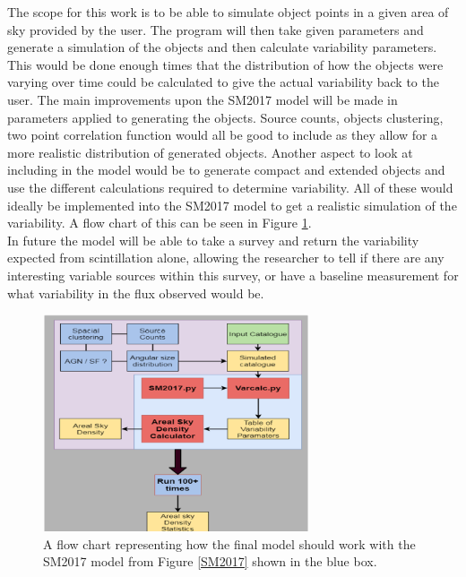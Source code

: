 \documentclass[10pt,a4paper]{article}
\begin{document}
The scope for this work is to be able to simulate object points in a given area of sky provided by the user. The program will then take given parameters and generate a simulation of the objects and then calculate variability parameters. This would be done enough times that the distribution of how the objects were varying over time could be calculated to give the actual variability back to the user. The main improvements upon the SM2017 model will be made in parameters applied to generating the objects. Source counts, objects clustering, two point correlation function would all be good to include as they allow for a more realistic distribution of generated objects. Another aspect to look at including in the model would be to generate compact and extended objects and use the different calculations required to determine variability. All of these would ideally be implemented into the SM2017 model to get a realistic simulation of the variability. A flow chart of this can be seen in Figure \ref{VarSim}.\\

In future the model will be able to take a survey and return the variability expected from scintillation alone, allowing the researcher to tell if there are any interesting variable sources within this survey, or have a baseline measurement for what variability in the flux observed would be.
\begin{figure}[H]
\begin{center}
	\includegraphics[width=0.7\textwidth]{VarSim}
	\caption{A flow chart representing how the final model should work with the SM2017 model from Figure \ref{SM2017} shown in the blue box.}
	\label{VarSim}
\end{center}
\end{figure}



			
			
			
			
\end{document}
